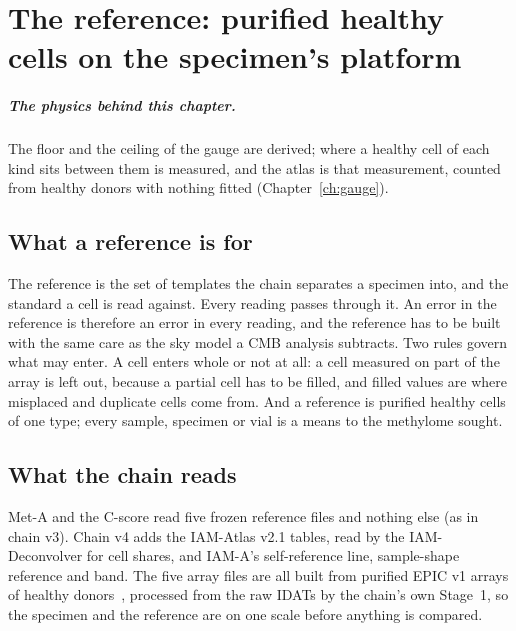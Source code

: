 \chapter{The reference: purified healthy cells on the specimen's platform}\label{ch:atlas}

\paragraph{The physics behind this chapter.} The floor and the ceiling of the gauge are derived; where a healthy cell of each kind sits between them is measured, and the atlas is that measurement, counted from healthy donors with nothing fitted (Chapter~\ref{ch:gauge}).

\section{What a reference is for}

The reference is the set of templates the chain separates a specimen into, and the standard a cell is read against. Every reading passes
through it. An error in the reference is therefore an error in every reading, and the reference has to be built with the same care as the sky
model a CMB analysis subtracts. Two rules govern what may enter. A cell enters whole or not at all: a cell measured on part of the array is
left out, because a partial cell has to be filled, and filled values are where misplaced and duplicate cells come from. And a reference is
purified healthy cells of one type; every sample, specimen or vial is a means to the methylome sought.

\section{What the chain reads}

Met-A and the C-score read five frozen reference files and nothing else (as in chain v3). Chain v4 adds the IAM-Atlas v2.1 tables, read by the IAM-Deconvolver for cell shares, and IAM-A's self-reference line, sample-shape reference and band. The five array files are all built from
purified EPIC v1 arrays of healthy donors~\cite{Salas2018,Salas2022}, processed from the raw IDATs by the chain's own Stage~1, so the specimen and the
reference are on one scale before anything is compared.


